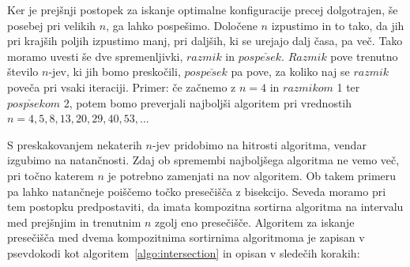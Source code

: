 \documentclass[a4paper,oneside,12pt]{article}
\begin{document}
Ker je prejšnji postopek za iskanje optimalne konfiguracije precej dolgotrajen, še posebej
pri velikih $n$, ga lahko pospešimo. Določene $n$ izpustimo in to tako, da jih pri krajših
poljih izpustimo manj, pri daljših, ki se urejajo dalj časa, pa več. Tako moramo uvesti še
dve spremenljivki, $razmik$ in $pospe\check{s}ek$. $Razmik$ pove trenutno število $n$-jev, ki jih
bomo preskočili, $pospe\check{s}ek$ pa pove, za koliko naj se $razmik$ poveča pri vsaki iteraciji.
Primer: če začnemo z $n = 4$ in $razmikom$ 1 ter $posp\check{s}ekom$ 2, potem bomo preverjali
najboljši algoritem pri vrednostih \mbox{$n = 4, 5, 8, 13, 20, 29, 40, 53,\dots$}

S preskakovanjem nekaterih $n$-jev pridobimo na hitrosti algoritma, vendar izgubimo na
natančnosti. Zdaj ob spremembi najboljšega algoritma ne vemo več, pri točno katerem $n$ je
potrebno zamenjati na nov algoritem. Ob takem primeru pa lahko natančneje poiščemo točko
presečišča z bisekcijo. Seveda moramo pri tem postopku predpostaviti, da imata kompozitna
sortirna algoritma na intervalu med prejšnjim in trenutnim $n$ zgolj eno presečišče.
Algoritem za iskanje presečišča med dvema kompozitnima sortirnima algoritmoma je zapisan v
psevdokodi kot algoritem~\ref{algo:intersection} in opisan v sledečih korakih:
\end{document}
